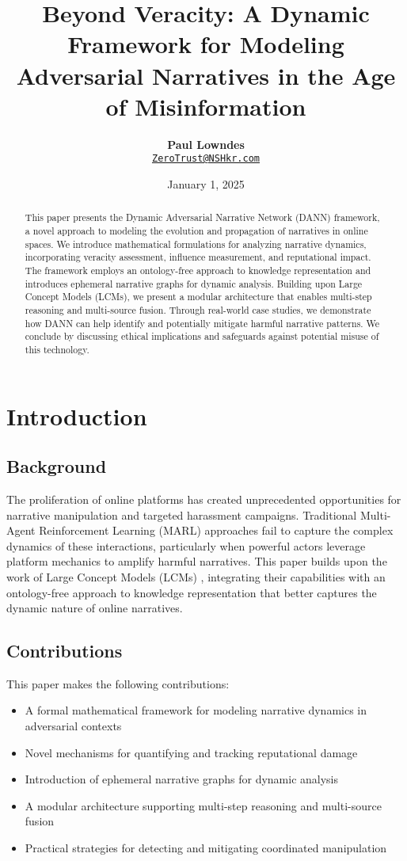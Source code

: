 \documentclass[12pt, a4paper]{article}
\title{\vspace{-2cm}\textbf{Beyond Veracity: A Dynamic Framework for Modeling Adversarial Narratives in the Age of Misinformation}}
\author{\textbf{Paul Lowndes} \\ \href{mailto:ZeroTrust@NSHkr.com}{\texttt{ZeroTrust@NSHkr.com}}}
\date{\small January 1, 2025}
\begin{document}
\maketitle
\vspace{-1.5em}

\begin{abstract}
This paper presents the Dynamic Adversarial Narrative Network (DANN) framework, a novel approach to modeling the evolution and propagation of narratives in online spaces. We introduce mathematical formulations for analyzing narrative dynamics, incorporating veracity assessment, influence measurement, and reputational impact. The framework employs an ontology-free approach to knowledge representation and introduces ephemeral narrative graphs\cite{ephemeral_knowledge_graphs} for dynamic analysis. Building upon Large Concept Models (LCMs), we present a modular architecture that enables multi-step reasoning and multi-source fusion. Through real-world case studies, we demonstrate how DANN can help identify and potentially mitigate harmful narrative patterns. We conclude by discussing ethical implications and safeguards against potential misuse of this technology.
\end{abstract}

\section{Introduction}
\subsection{Background}
The proliferation of online platforms has created unprecedented opportunities for narrative manipulation and targeted harassment campaigns. Traditional Multi-Agent Reinforcement Learning (MARL) approaches fail to capture the complex dynamics of these interactions, particularly when powerful actors leverage platform mechanics to amplify harmful narratives. This paper builds upon the work of Large Concept Models (LCMs) \cite{lcm_paper}, integrating their capabilities with an ontology-free approach to knowledge representation that better captures the dynamic nature of online narratives.

\subsection{Contributions}
This paper makes the following contributions:
\begin{itemize}
    \item A formal mathematical framework for modeling narrative dynamics in adversarial contexts
    \item Novel mechanisms for quantifying and tracking reputational damage
    \item Introduction of ephemeral narrative graphs for dynamic analysis
    \item A modular architecture supporting multi-step reasoning and multi-source fusion
    \item Practical strategies for detecting and mitigating coordinated manipulation
\end{itemize}
\end{document}
